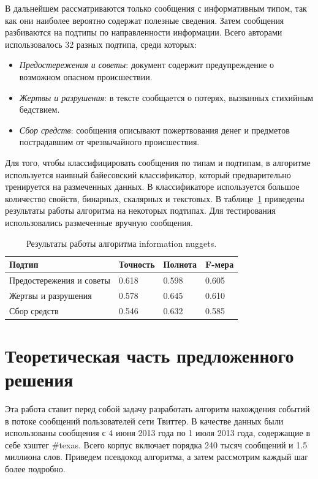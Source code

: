 \documentclass[12pt, a4paper]{article}
\begin{document}
	В дальнейшем рассматриваются только сообщения с информативным типом, так как они наиболее вероятно содержат полезные сведения. Затем сообщения разбиваются на подтипы по направленности информации. Всего авторами использовалось 32 разных подтипа, среди которых:
	\begin{itemize}
	\item\emph{Предостережения и советы}: документ содержит предупреждение о возможном опасном происшествии.
	\item\emph{Жертвы и разрушения}: в тексте сообщается о потерях, вызванных стихийным бедствием.
	\item\emph{Сбор средств}: сообщения описывают пожертвования денег и предметов пострадавшим от чрезвычайного происшествия.
	\end{itemize}
	
	Для того, чтобы классифицировать сообщения по типам и подтипам, в алгоритме используется наивный байесовский классификатор, который предварительно тренируется на размеченных данных. В классификаторе используется большое количество свойств, бинарных, скалярных и текстовых. В таблице~\ref{nuggets-table} приведены результаты работы алгоритма на некоторых подтипах. Для тестирования использовались размеченные вручную сообщения.
	\begin{table}[h]
	\centering
	\begin{tabular}{ | l | l | l | l | }
	\hline
	Подтип & Точность & Полнота & F-мера \\ \hline
	Предостережения и советы & 0.618 & 0.598 & 0.605 \\ \hline
	Жертвы и разрушения & 0.578 & 0.645 & 0.610 \\ \hline
	Сбор средств & 0.546 & 0.632 & 0.585 \\ \hline
	\end{tabular}
	\caption{Результаты работы алгоритма information nuggets.}
	\label{nuggets-table}
	\end{table}
  
  \section{Теоретическая часть предложенного решения}
  Эта работа ставит перед собой задачу разработать алгоритм нахождения событий в потоке сообщений пользователей сети Твиттер. В качестве данных были использованы сообщения с 4 июня 2013 года по 1 июля 2013 года, содержащие в себе хэштег \#texas. Всего корпус включает порядка 240 тысяч сообщений и 1.5 миллиона слов. Приведем псевдокод алгоритма, а затем рассмотрим каждый шаг более подробно. 
  
\end{document}
